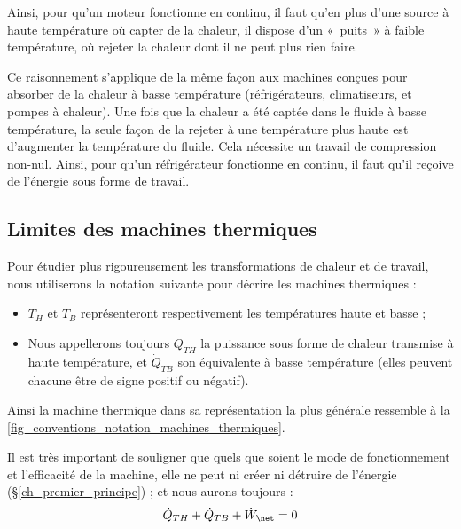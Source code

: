 		Ainsi, pour qu’un moteur fonctionne en continu, il faut qu’en plus d’une source à haute température où capter de la chaleur, il dispose d’un «~puits~» à faible température, où rejeter la chaleur dont il ne peut plus rien faire.

		Ce raisonnement s’applique de la même façon aux machines conçues pour absorber de la chaleur à basse température (réfrigérateurs, climatiseurs, et pompes à chaleur). Une fois que la chaleur a été captée dans le fluide à basse température, la seule façon de la rejeter à une température plus haute est d’augmenter la température du fluide. Cela nécessite un travail de compression non-nul. Ainsi, pour qu’un réfrigérateur fonctionne en continu, il faut qu’il reçoive de l’énergie sous forme de travail.


	\subsection{Limites des machines thermiques}
	\label{ch_limites_machines_thermiques}
	
		Pour étudier plus rigoureusement les transformations de chaleur et de travail, nous utiliserons la notation suivante pour décrire les machines thermiques :

		\begin{itemize}
			\item $T_H$ et $T_B$ représenteront respectivement les températures haute et basse ;
			\item Nous appellerons toujours $\dot Q_{TH}$ la puissance sous forme de chaleur transmise à haute température, et $\dot Q_{TB}$ son équivalente à basse température (elles peuvent chacune être de signe positif ou négatif).
		\end{itemize}

		Ainsi la machine thermique dans sa représentation la plus générale ressemble à la \cref{fig_conventions_notation_machines_thermiques}.

		Il est très important de souligner que quels que soient le mode de fonctionnement et l'efficacité de la machine, elle ne peut ni créer ni détruire de l’énergie (\S\ref{ch_premier_principe}) ; et nous aurons toujours :
		\begin{equation}
			\dot Q_{TH} + \dot Q_{TB} + \dot W_\net = 0
			\label{eq_premier_principe_machines}
		\end{equation}


